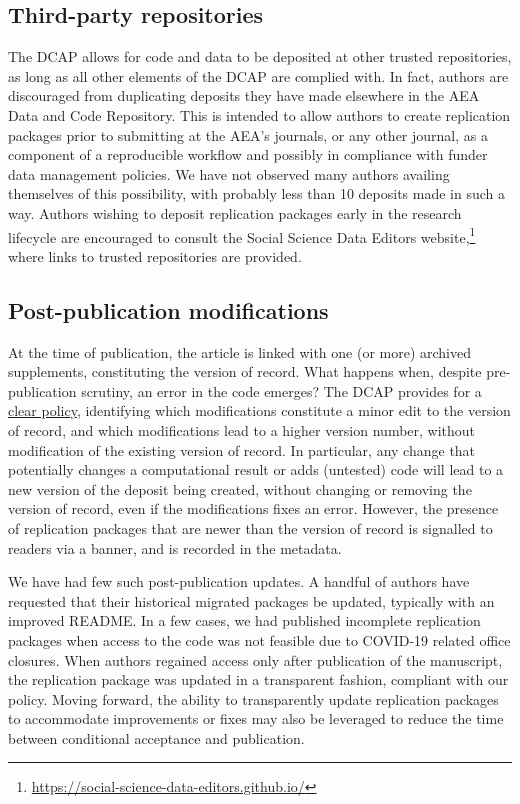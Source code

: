 \documentclass[PP]{AEA}
\newcommand{\aeadcr}{AEA Data and Code Repository}
\newcommand{\curlcite}[2]{#2,\footnote{\url{#1}}}
\begin{document}
\subsection{Third-party repositories}

The \ac{DCAP} allows for code and data  to be deposited at other trusted repositories, as long as all other elements of the \ac{DCAP} are complied with. In fact, authors are discouraged from duplicating deposits they have made elsewhere in the \aeadcr{}. This is intended to allow authors to create replication packages prior to submitting at the AEA's journals, or any other journal, as a component of a reproducible workflow and possibly in compliance with funder data management policies. We have not observed many authors availing themselves of this possibility, with probably less than 10 deposits made in such a way. Authors wishing to deposit replication packages early in the research lifecycle are encouraged to consult the \curlcite{https://social-science-data-editors.github.io/}{Social Science Data Editors website} where links to trusted repositories are provided.
	
\subsection{Post-publication modifications}

At the time of publication, the article is linked with one (or more) archived supplements, constituting the version of record. What happens when, despite pre-publication scrutiny, an error in the code emerges? The \ac{DCAP} provides for a \href{https://www.aeaweb.org/journals/data/policy-revisions}{clear policy}, identifying which modifications constitute a minor edit to the version of record, and which modifications lead to a higher version number, without modification of the existing version of record. In particular, any change that potentially changes a computational result or adds (untested) code will lead to a new version of the deposit being created, without changing or removing the version of record, even if the modifications fixes an error. However, the presence of replication packages that are newer than the version of record is signalled to readers via a banner, and is recorded in the metadata.

We have had few such post-publication updates. A handful of authors have requested that their historical migrated packages be updated, typically with an improved README. In a few cases, we had published incomplete replication packages when access to the code was not feasible due to COVID-19 related office closures. When authors regained access only after publication of the manuscript, the replication package was updated in a transparent fashion, compliant with our policy. Moving forward, the ability to transparently update replication packages to accommodate improvements or fixes may also be leveraged to reduce the time between conditional acceptance and publication.
\end{document}
